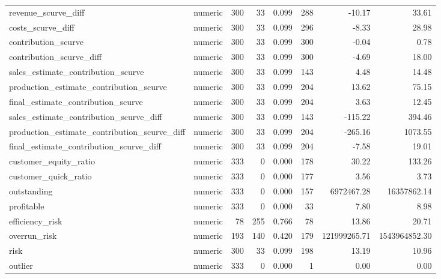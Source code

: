 \begin{landscape}
\begin{longtable}[t]{llrrrrrr}
revenue\_scurve\_diff & numeric & 300 & 33 & 0.099 & 288 & -10.17 & 33.61\\
costs\_scurve\_diff & numeric & 300 & 33 & 0.099 & 296 & -8.33 & 28.98\\
contribution\_scurve & numeric & 300 & 33 & 0.099 & 300 & -0.04 & 0.78\\
contribution\_scurve\_diff & numeric & 300 & 33 & 0.099 & 300 & -4.69 & 18.00\\
sales\_estimate\_contribution\_scurve & numeric & 300 & 33 & 0.099 & 143 & 4.48 & 14.48\\
production\_estimate\_contribution\_scurve & numeric & 300 & 33 & 0.099 & 204 & 13.62 & 75.15\\
final\_estimate\_contribution\_scurve & numeric & 300 & 33 & 0.099 & 204 & 3.63 & 12.45\\
sales\_estimate\_contribution\_scurve\_diff & numeric & 300 & 33 & 0.099 & 143 & -115.22 & 394.46\\
production\_estimate\_contribution\_scurve\_diff & numeric & 300 & 33 & 0.099 & 204 & -265.16 & 1073.55\\
final\_estimate\_contribution\_scurve\_diff & numeric & 300 & 33 & 0.099 & 204 & -7.58 & 19.01\\
customer\_equity\_ratio & numeric & 333 & 0 & 0.000 & 178 & 30.22 & 133.26\\
customer\_quick\_ratio & numeric & 333 & 0 & 0.000 & 177 & 3.56 & 3.73\\
outstanding & numeric & 333 & 0 & 0.000 & 157 & 6972467.28 & 16357862.14\\
profitable & numeric & 333 & 0 & 0.000 & 33 & 7.80 & 8.98\\
efficiency\_risk & numeric & 78 & 255 & 0.766 & 78 & 13.86 & 20.71\\
overrun\_risk & numeric & 193 & 140 & 0.420 & 179 & 121999265.71 & 1543964852.30\\
risk & numeric & 300 & 33 & 0.099 & 198 & 13.19 & 10.96\\
outlier & numeric & 333 & 0 & 0.000 & 1 & 0.00 & 0.00\\*
\end{longtable}
\end{landscape}
\endgroup{}
